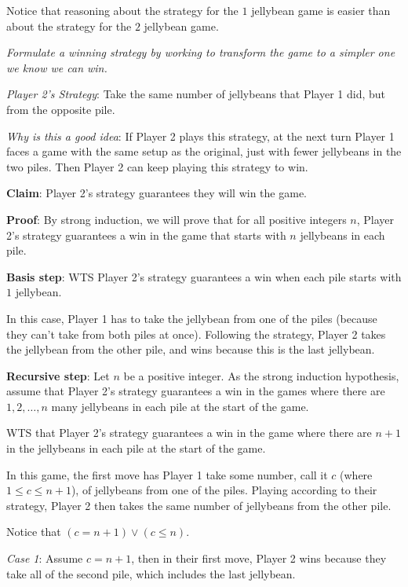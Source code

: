\documentclass[12pt, oneside]{article}
\begin{document}
\vspace{200pt}


Notice that reasoning about the strategy for the $1$ jellybean 
game is easier than about the strategy for the $2$ jellybean game.

{\it Formulate a winning strategy by working to 
transform the game to a simpler one we know we can win.}

\newpage

{\it Player 2's Strategy}: Take the same number of jellybeans that Player 1 did, 
but from the opposite pile. 


{\it Why is this a good idea}: If Player 2 plays this strategy, at the next turn
Player 1 faces a game with the same setup as the original, just with fewer
jellybeans in the two piles. Then Player 2 can keep playing this strategy to win.

{\bf Claim}: Player 2's strategy guarantees they will win the game.

{\bf Proof}: By strong induction, we will prove that for all positive 
integers $n$, Player 2's strategy guarantees a win in the game that starts with 
$n$ jellybeans in each pile.

{\bf Basis step}: WTS Player 2's strategy guarantees a win 
when each pile starts with $1$ jellybean.

In this case, Player 1 has to take the jellybean from one of the piles
(because they can't take from both piles at once).
Following the strategy, Player 2 takes the jellybean from the 
other pile, and wins because this is the last jellybean.

{\bf Recursive step}: Let $n$ be a positive integer. 
As the strong induction hypothesis, assume that
Player 2's strategy guarantees a win in the games 
where there are $1, 2, \ldots, n$ many jellybeans in each 
pile at the start of the game.

WTS that Player 2's strategy guarantees a win in the game where
there are $n+1$ in the jellybeans in each pile at the start of the game.

In this game, the first move has Player 1 take 
some number, call it $c$ (where $1 \leq c \leq n+1$),
of jellybeans from one of the piles. 
Playing according to their strategy, Player 2 then 
takes the same number of jellybeans from  the other pile.

Notice that $(c = n+1) \lor (c \leq n)$.

{\it Case 1}: Assume $c = n+1$, then in their first move, 
Player 2 wins because they take all of the second pile, which 
includes the last jellybean.
\end{document}
